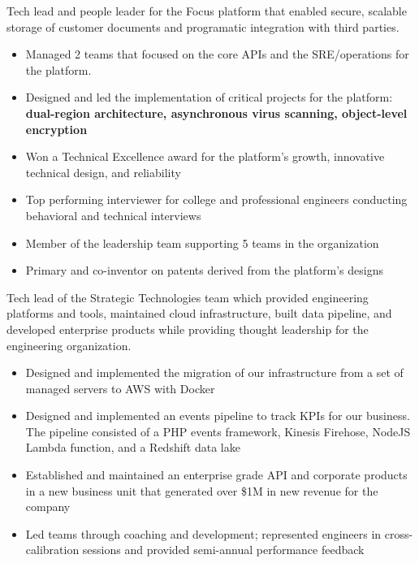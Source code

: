 \documentclass[10pt,a4paper,ragged2e,withhyper]{altacv}
\begin{document}
\begin{paracol}{2}
\divider{}

Tech lead and people leader for the Focus platform that enabled secure, scalable storage of customer documents and programatic integration with third parties.
\begin{itemize}
\item Managed 2 teams that focused on the core APIs and the SRE/operations for the platform.
\item Designed and led the implementation of critical projects for the platform: \textbf{dual-region architecture, asynchronous virus scanning, object-level encryption}
\item Won a Technical Excellence award for the platform's growth, innovative technical design, and reliability
\item Top performing interviewer for college and professional engineers conducting behavioral and technical interviews
\item Member of the leadership team supporting 5 teams in the organization
\item Primary and co-inventor on patents derived from the platform's designs
\end{itemize}


\divider{}

Tech lead of the Strategic Technologies team which provided engineering platforms and tools, maintained cloud infrastructure, built data pipeline, and developed enterprise products while providing thought leadership for the engineering organization.
\begin{itemize}
\item Designed and implemented the migration of our infrastructure from a set of managed servers to AWS with Docker
\item Designed and implemented an events pipeline to track KPIs for our business. The pipeline consisted of a PHP events framework, Kinesis Firehose, NodeJS Lambda function, and a Redshift data lake
\item Established and maintained an enterprise grade API and corporate products in a new business unit that generated over \$1M in new revenue for the company
\item Led teams through coaching and development; represented engineers in cross-calibration sessions and provided semi-annual performance feedback
\end{itemize}


\end{paracol}
\end{document}
